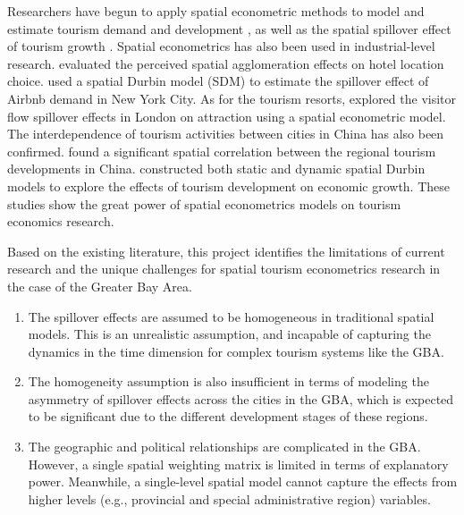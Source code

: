 \documentclass[11pt,a4paper]{amsart}
\theoremstyle{plain}
\theoremstyle{definition}
\begin{document}
\noindent Researchers have begun to apply spatial econometric methods to model and estimate tourism demand and development \parencite{dengModellingAustralianDomestic2011, marrocuDifferentTouristsDifferent2013}, as well as the spatial spillover effect of tourism growth \parencite{yangSpatialEffectsRegional2014, maTourismSpatialSpillover2015}. Spatial econometrics has also been used in industrial-level research. \textcite{adamPerceivedSpatialAgglomeration2014} evaluated the perceived spatial agglomeration effects on hotel location choice. \textcite{gunterModelingAirbnbDemand2020} used a spatial Durbin model (SDM) to estimate the spillover effect of Airbnb demand in New York City. As for the tourism resorts, \textcite{kimVisitorFlowSpillover2022} explored the visitor flow spillover effects in London on attraction using a spatial econometric model. The interdependence of tourism activities between cities in China has also been confirmed. \textcite{yangSpatialEffectsRegional2014} found a significant spatial correlation between the regional tourism developments in China. \textcite{liuEffectsTourismDevelopment2022} constructed both static and dynamic spatial Durbin models to explore the effects of tourism development on economic growth. These studies show the great power of spatial econometrics models on tourism economics research. 

\noindent Based on the existing literature, this project identifies the limitations of current research and the unique challenges for spatial tourism econometrics research in the case of the Greater Bay Area. 
\begin{enumerate}
	\item The spillover effects are assumed to be homogeneous in traditional spatial models. This is an unrealistic assumption, and incapable of capturing the dynamics in the time dimension for complex tourism systems like the GBA.
	\item The homogeneity assumption is also insufficient in terms of modeling the asymmetry of spillover effects across the cities in the GBA, which is expected to be significant due to the different development stages of these regions.  
	\item The geographic and political relationships are complicated in the GBA. However, a single spatial weighting matrix is limited in terms of explanatory power. Meanwhile, a single-level spatial model cannot capture the effects from higher levels (e.g., provincial and special administrative region) variables. 
\end{enumerate}
\end{document}
